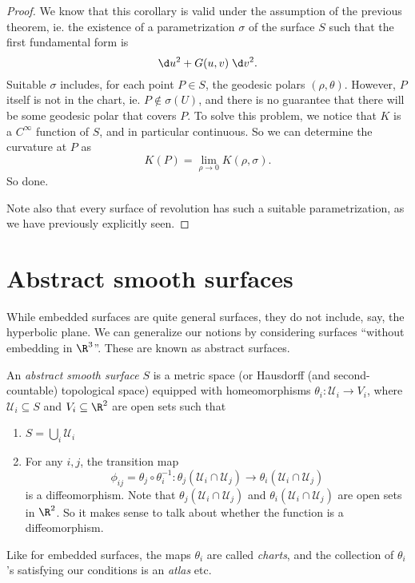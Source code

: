\documentclass[a4paper]{article}
\begin{document}
\begin{proof}
  We know that this corollary is valid under the assumption of the previous theorem, ie. the existence of a parametrization $\sigma$ of the surface $S$ such that the first fundamental form is
  \[
    \d u^2 + G(u, v) \;\d v^2.
  \]
  Suitable $\sigma$ includes, for each point $P \in S$, the geodesic polars $(\rho, \theta)$. However, $P$ itself is not in the chart, ie. $P \not\in \sigma(U)$, and there is no guarantee that there will be some geodesic polar that covers $P$. To solve this problem, we notice that $K$ is a $C^\infty$ function of $S$, and in particular continuous. So we can determine the curvature at $P$ as
  \[
    K(P) = \lim_{\rho \to 0} K(\rho, \sigma).
  \]
  So done.

  Note also that every surface of revolution has such a suitable parametrization, as we have previously explicitly seen.
\end{proof}

\section{Abstract smooth surfaces}
While embedded surfaces are quite general surfaces, they do not include, say, the hyperbolic plane. We can generalize our notions by considering surfaces ``without embedding in $\R^3$''. These are known as abstract surfaces.
\begin{defi}
  An \emph{abstract smooth surface} $S$ is a metric space (or Hausdorff (and second-countable) topological space) equipped with homeomorphisms $\theta_i: \mathcal{U}_i \to V_i$, where $\mathcal{U}_i \subseteq S$ and $V_i \subseteq \R^2$ are open sets such that
  \begin{enumerate}
    \item $S = \bigcup_i \mathcal{U}_i$
    \item For any $i, j$, the transition map
      \[
        \phi_{ij} = \theta_j \circ \theta_i^{-1}: \theta_j(\mathcal{U}_i \cap \mathcal{U}_j) \to \theta_i(\mathcal{U}_i \cap \mathcal{U}_j)
      \]
      is a diffeomorphism. Note that $\theta_j(\mathcal{U}_i \cap \mathcal{U}_j)$ and $\theta_i (\mathcal{U}_i \cap \mathcal{U}_j)$ are open sets in $\R^2$. So it makes sense to talk about whether the function is a diffeomorphism.
  \end{enumerate}
\end{defi}
Like for embedded surfaces, the maps $\theta_i$ are called \emph{charts}, and the collection of $\theta_i$'s satisfying our conditions is an \emph{atlas} etc.
\end{document}
